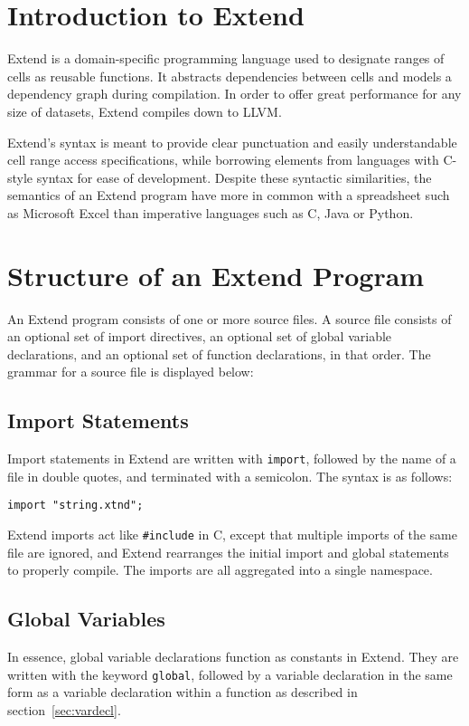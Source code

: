 \section{Introduction to Extend}
	Extend is a domain-specific programming language used to designate ranges of cells as reusable functions. It abstracts dependencies between cells and models a dependency graph during compilation. In order to offer great performance for any size of datasets, Extend compiles down to LLVM.
	
	Extend's syntax is meant to provide clear punctuation and easily understandable cell range access specifications, while borrowing elements from languages with C-style syntax for ease of development. Despite these syntactic similarities, the semantics of an Extend program have more in common with a spreadsheet such as Microsoft Excel than imperative languages such as C, Java or Python.
\section{Structure of an Extend Program}
\label{sec:Grammar}
	An Extend program consists of one or more source files. A source file consists of an optional set of import directives, an optional set of global variable declarations, and an optional set of function declarations, in that order. The grammar for a source file is displayed below:

	\subsection{Import Statements}
		Import statements in Extend are written with \texttt{import}, followed by the name of a file in double quotes, and terminated with a semicolon. The syntax is as follows:
		\begin{lstlisting}
import "string.xtnd";
		\end{lstlisting}
		
		Extend imports act like \texttt{\#include} in C, except that multiple imports of the same file are ignored, and Extend rearranges the initial import and global statements to properly compile. The imports are all aggregated into a single namespace.
	\subsection{Global Variables}
		In essence, global variable declarations function as constants in Extend. They are written with the keyword \texttt{global}, followed by a variable declaration in the same form as a variable declaration within a function as described in section~\ref{sec:vardecl}. 
